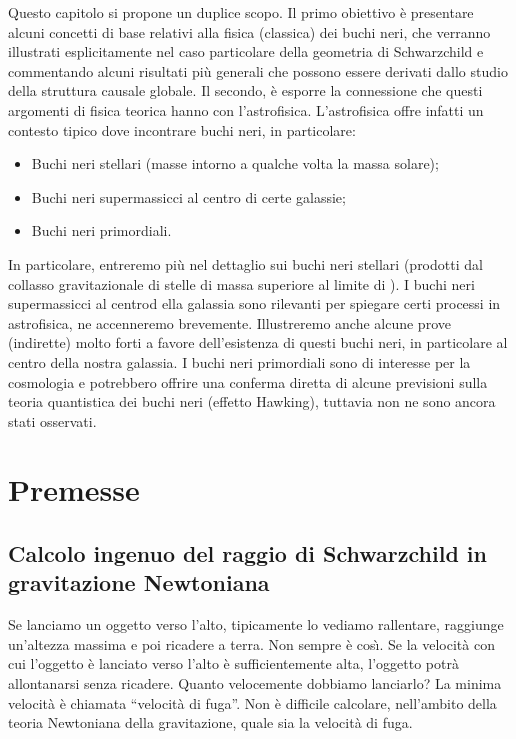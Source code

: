 

 \label{chap:buchi neri}
\minitoc\mtcskip

\noindent Questo capitolo si propone un duplice scopo. 
Il primo  obiettivo \`e 
presentare alcuni concetti di base relativi alla fisica (classica) dei buchi
neri, che verranno illustrati  esplicitamente nel caso particolare della geometria di
Schwarzchild e commentando alcuni risultati pi\`u generali  che possono essere
derivati dallo studio della struttura causale globale.
Il secondo, \`e esporre la connessione che questi argomenti di fisica teorica
hanno con l'astrofisica. L'astrofisica offre infatti un contesto tipico dove
incontrare buchi neri, in particolare:
\begin{itemize}
   \item Buchi neri stellari (masse intorno a qualche volta la massa solare);
   \item Buchi neri supermassicci al centro di certe galassie;
   \item Buchi neri primordiali.
\end{itemize}
In particolare, entreremo pi\`u nel dettaglio sui buchi neri stellari (prodotti
dal collasso gravitazionale di stelle di massa superiore al limite di ).
I buchi neri supermassicci al centrod ella galassia sono rilevanti per spiegare
certi processi in astrofisica, ne accenneremo brevemente. 
Illustreremo anche alcune prove (indirette) molto forti a favore dell'esistenza
di questi buchi neri, in particolare al centro della nostra galassia.
I buchi neri primordiali sono di interesse per la cosmologia e potrebbero
offrire una conferma diretta di alcune previsioni sulla teoria quantistica dei
buchi neri 
(effetto Hawking), tuttavia non ne sono ancora stati osservati.

\section{Premesse}

\subsection{Calcolo ingenuo del raggio di Schwarzchild in gravitazione
   Newtoniana}

Se lanciamo un oggetto verso l'alto, tipicamente lo vediamo rallentare,
raggiunge un'altezza massima e poi ricadere a terra. Non sempre \`e cos\`{\i}.
Se la velocit\`a con cui l'oggetto \`e lanciato verso l'alto \`e
sufficientemente alta, l'oggetto potr\`a allontanarsi senza ricadere. Quanto
velocemente dobbiamo lanciarlo? La minima velocit\`a \`e chiamata ``velocit\`a
di fuga''. Non \`e difficile calcolare, nell'ambito della teoria Newtoniana
della gravitazione, quale sia la velocit\`a di fuga.

